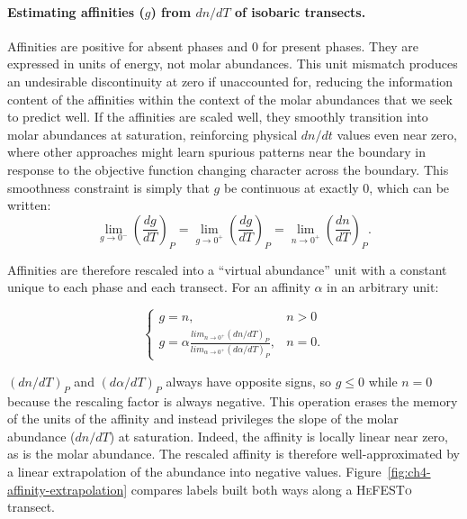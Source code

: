 \paragraph{Estimating affinities ($g$) from $dn/dT$ of isobaric transects.} Affinities are positive for absent phases and 0 for present phases. They are expressed in units of energy, not molar abundances. This unit mismatch produces an undesirable discontinuity at zero if unaccounted for, reducing the information
content of the affinities within the context of the molar abundances that we seek to predict well. If the affinities are scaled well, they smoothly transition into molar abundances at saturation, 
reinforcing physical $dn/dt$ values even near zero, where other approaches might learn spurious patterns near the boundary in response to the objective function changing 
character across the boundary. This smoothness constraint is simply that $g$ be continuous at exactly 0, which can be written:
\begin{equation}
  \lim_{g \to 0^-} \left(\frac{dg}{dT}\right)_P = \lim_{g \to 0^+} \left(\frac{dg}{dT}\right)_P = \lim_{n \to 0^+} \left(\frac{dn}{dT}\right)_P.
  \label{eq:affinity_continuity}
\end{equation}

Affinities are therefore rescaled into a ``virtual abundance'' unit with a constant unique to each phase and each transect. For an affinity $\alpha$ in an arbitrary unit:

\begin{equation}
  \begin{cases}
    g = n, & n > 0 \\
    g =  \alpha \frac{lim_{n \to 0^+} (dn/dT)_P}{lim_{\alpha \to 0^+} (d\alpha/dT)_P}, & n = 0 .
  \end{cases}
\label{eq:affinity_rescaling}
\end{equation}

$(dn/dT)_P$ and $(d\alpha/dT)_P$ always have opposite signs, so $g \leq 0$ while $n=0$ because the rescaling factor is always negative. 
This operation erases the memory of the units of the affinity and instead privileges the slope of the molar abundance ($dn/dT$) at saturation. 
Indeed, the affinity is locally linear near zero, as is the molar abundance. The rescaled affinity is therefore well-approximated by a linear 
extrapolation of the abundance into negative values. 
Figure~\ref{fig:ch4-affinity-extrapolation} compares labels built both ways along a \textsc{HeFESTo} transect.

